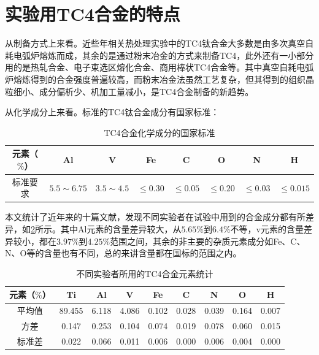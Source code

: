 \documentclass[
class = book,
zihao = -4,
font = noto,
paper = a4paper,
openany
]{easybook}
\begin{document}
\section{实验用TC4合金的特点}
从制备方式上来看。近些年相关热处理实验中的TC4钛合金大多数是由{多次真空自耗电弧炉熔炼}\cite{renchiqiangGurongshixiaoduiTC4taihejinxianweizuzhihelixuexingnengdeyingxiang2022,ranxingGurongwenduduiTi6Al4VELItaihejinxianweizuzhijixingnengdeyingxiang2021,lilouGurongshixiaoduiTC4hejinzuzhiyujixiexingnengdeyingxiang2014,jingranGurongshixiaoduiTC4hejinzuzhiyuxingnengdeyingxiang2018}而成，其余的是通过粉末冶金\cite{zhanghaoyinGurongShixiaoduiTC4taihejinzuzhihelixuexingnengdeyingxiang2014,xujianGurongshixiaogongyiduiTC4taihejinzuzhijixingnengdeyingxiang2014}的方式来制备TC4，此外还有一小部分用的是热轧合金\cite{LiuWanYingBuTongReChuLiGongYiDuiTi6Al4VTaiHeJinWeiGuanJieGouHeLiXueXingNengYingXiangYingWen2017}、电子束选区熔化合金\cite{leijunleDianzishuxuanquronghuachengxingTC4hejinxianweizuzhiyuxingnengdeyanjiujinzhan2022}、商用棒状TC4合金\cite{luyuanyuanShixiaochuliduiTC4taihejinweiguanzuzhihelixuexingnengdeyingxiang2019,baoxuechunRechuligongyiduiTC4taihejinzuzhihelixuexingnengdeyingxiang2019}等。其中真空自耗电弧炉熔炼得到的合金强度普遍较高，而粉末冶金法虽然工艺复杂，但其得到的组织晶粒细小、成分偏析少、机加工量减小，是TC4合金制备的新趋势。

从化学成分上来看。标准的TC4钛合金成分有国家标准：
\begin{table}[htbp]
	\centering
	\label{sec:mytc4chem}
	\caption{TC4合金化学成分的国家标准}
	\begin{tabular}{cccccccc}
		\toprule
		元素（$ \% $） & Al & V &Fe &C& O& N &H \\ \midrule
		标准要求 &$ 5.5\sim 6.75 $ & $ 3.5\sim 4.5 $&$ \le 0.30 $ & $ \le 0.05 $&$ \le 0.20 $&$ \le 0.03$ &$ \le 0.015 $  \\ \bottomrule
	\end{tabular}
\end{table}


本文统计了近年来的十篇文献，发现不同实验者在试验中用到的合金成分都有所差异，如\ref{sec:mytc4ave}所示。其中Al元素的含量差异较大，从$ 5.65\% $到$ 6.4\% $不等，v元素的含量差异较小，都在$ 3.97 \%$到$ 4.25\% $范围之间，其余的非主要的杂质元素成分如Fe、C、N、O等的含量也有不同，总的来讲含量都在国标的范围之内。
\begin{table}[htbp]
	\centering
	\caption{不同实验者所用的TC4合金元素统计}
	\label{sec:mytc4ave}
	\begin{tabular}{ccccccccc}
		\toprule
元素（$ \% $）& Ti  & Al & V &Fe &C& N& O &H \\ \midrule
平均值 & 89.455 & 6.118 & 4.086 & 0.102 & 0.028 & 0.039 & 0.164 & 0.007 \\
方差 & 0.147 & 0.253 & 0.104 & 0.074 & 0.019 & 0.078 & 0.060 & 0.015 \\
标准差 & 0.022 & 0.066 & 0.011 & 0.006 & 0.000 & 0.006 & 0.004 & 0.000 \\
		\bottomrule
	\end{tabular}
\end{table}
\end{document}
